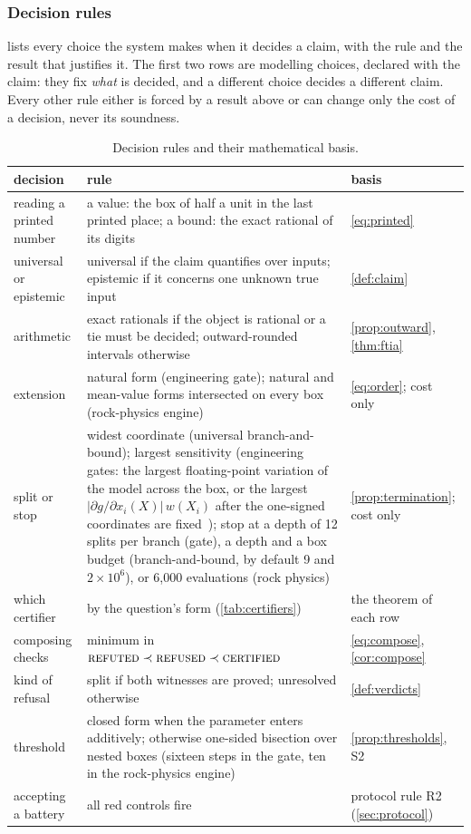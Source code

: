 \documentclass[preprint,11pt,a4paper]{elsarticle}
\theoremstyle{definition}
\newcommand{\verdict}[1]{\textup{\textsc{#1}}}
\newcommand{\CERT}{\verdict{certified}}
\newcommand{\REFT}{\verdict{refuted}}
\newcommand{\REFS}{\verdict{refused}}
\newcommand{\supp}[1]{S#1}
\begin{document}
\subsubsection{Decision rules}\label{sec:decisions}

 lists every choice the system makes when it decides a claim, with the rule and the result that justifies it. The first two rows are modelling choices, declared with the claim: they fix \emph{what} is decided, and a different choice decides a different claim. Every other rule either is forced by a result above or can change only the cost of a decision, never its soundness.

\begin{table}[htbp]
\centering\footnotesize
\caption{Decision rules and their mathematical basis.}
\label{tab:decisions}
\begin{tabular}{@{}L{2.4cm}L{5.2cm}L{4.1cm}@{}}
\toprule
decision & rule & basis \\
\midrule
reading a printed number & a value: the box of half a unit in the last printed place; a bound: the exact rational of its digits & \cref{eq:printed} \\
universal or epistemic & universal if the claim quantifies over inputs; epistemic if it concerns one unknown true input & \cref{def:claim} \\
arithmetic & exact rationals if the object is rational or a tie must be decided; outward-rounded intervals otherwise & \cref{prop:outward}, \cref{thm:ftia} \\
extension & natural form (engineering gate); natural and mean-value forms intersected on every box (rock-physics engine) & \cref{eq:order}; cost only \\
split or stop & widest coordinate (universal branch-and-bound); largest sensitivity (engineering gates: the largest floating-point variation of the model across the box, or the largest $|\partial g/\partial x_i(X)|\,w(X_i)$ after the one-signed coordinates are fixed~\citep{HansenWalster04,RatzCsendes95}); stop at a depth of 12 splits per branch (gate), a depth and a box budget (branch-and-bound, by default 9 and $2\times10^6$), or 6{,}000 evaluations (rock physics) & \cref{prop:termination}; cost only \\
which certifier & by the question's form (\cref{tab:certifiers}) & the theorem of each row \\
composing checks & minimum in $\REFT\prec\REFS\prec\CERT$ & \cref{eq:compose}, \cref{cor:compose} \\
kind of refusal & split if both witnesses are proved; unresolved otherwise & \cref{def:verdicts} \\
threshold & closed form when the parameter enters additively; otherwise one-sided bisection over nested boxes (sixteen steps in the gate, ten in the rock-physics engine) & \cref{prop:thresholds}, \supp{2} \\
accepting a battery & all red controls fire & protocol rule R2 (\cref{sec:protocol}) \\
\bottomrule
\end{tabular}
\end{table}
\end{document}
